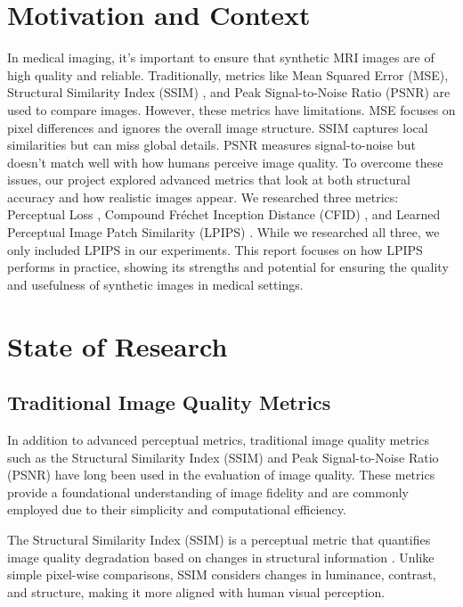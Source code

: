 \documentclass[a4paper,12pt]{article}
\begin{document}
\section{Motivation and Context}
In medical imaging, it's important to ensure that synthetic MRI images are of high quality and reliable. Traditionally, metrics like Mean Squared Error (MSE), Structural Similarity Index (SSIM) \cite{zhou_wang_image_2004}, and Peak Signal-to-Noise Ratio (PSNR) \cite{zhou_wang_image_2004} are used to compare images. However, these metrics have limitations. MSE focuses on pixel differences and ignores the overall image structure. SSIM captures local similarities but can miss global details. PSNR measures signal-to-noise but doesn't match well with how humans perceive image quality. To overcome these issues, our project explored advanced metrics that look at both structural accuracy and how realistic images appear. We researched three metrics: Perceptual Loss \cite{johnson_perceptual_2016}, Compound Fréchet Inception Distance (CFID) \cite{nunn_compound_nodate}, and Learned Perceptual Image Patch Similarity (LPIPS) \cite{zhang_unreasonable_2018}. While we researched all three, we only included LPIPS in our experiments. This report focuses on how LPIPS performs in practice, showing its strengths and potential for ensuring the quality and usefulness of synthetic images in medical settings.


\section{State of Research}
\subsection{Traditional Image Quality Metrics}

In addition to advanced perceptual metrics, traditional image quality metrics such as the Structural Similarity Index (SSIM) \cite{zhou_wang_image_2004} and Peak Signal-to-Noise Ratio (PSNR) \cite{zhou_wang_image_2004} have long been used in the evaluation of image quality. These metrics provide a foundational understanding of image fidelity and are commonly employed due to their simplicity and computational efficiency.


The Structural Similarity Index (SSIM) is a perceptual metric that quantifies image quality degradation based on changes in structural information \cite{zhou_wang_image_2004}. Unlike simple pixel-wise comparisons, SSIM considers changes in luminance, contrast, and structure, making it more aligned with human visual perception.
\end{document}
